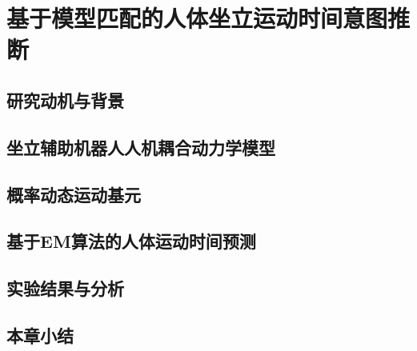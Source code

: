 \chapter{基于模型匹配的人体坐立运动时间意图推断}

\section{研究动机与背景}    

\section{坐立辅助机器人人机耦合动力学模型}  

\section{概率动态运动基元}   

\section{基于EM算法的人体运动时间预测}

\section{实验结果与分析}

\section{本章小结}
